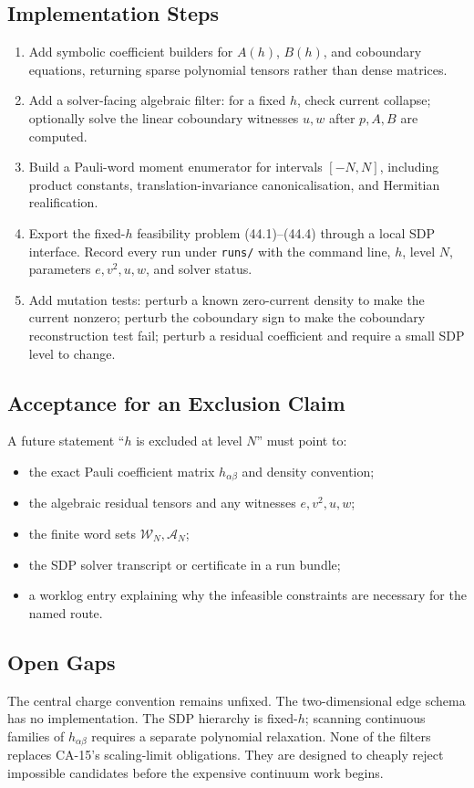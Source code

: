 \subsection{Implementation Steps}

\begin{enumerate}
\item Add symbolic coefficient builders for \(A(h)\), \(B(h)\), and
  coboundary equations, returning sparse polynomial tensors rather than dense
  matrices.
\item Add a solver-facing algebraic filter: for a fixed \(h\), check current
  collapse; optionally solve the linear coboundary witnesses \(u,w\) after
  \(p,A,B\) are computed.
\item Build a Pauli-word moment enumerator for intervals \([-N,N]\), including
  product constants, translation-invariance canonicalisation, and Hermitian
  realification.
\item Export the fixed-\(h\) feasibility problem (44.1)--(44.4) through a local
  SDP interface.  Record every run under \texttt{runs/} with the command line,
  \(h\), level \(N\), parameters \(e,v^2,u,w\), and solver status.
\item Add mutation tests: perturb a known zero-current density to make the
  current nonzero; perturb the coboundary sign to make the coboundary
  reconstruction test fail; perturb a residual coefficient and require a small
  SDP level to change.
\end{enumerate}

\subsection{Acceptance for an Exclusion Claim}

A future statement ``\(h\) is excluded at level \(N\)'' must point to:

\begin{itemize}
\item the exact Pauli coefficient matrix \(h_{\alpha\beta}\) and density
  convention;
\item the algebraic residual tensors and any witnesses \(e,v^2,u,w\);
\item the finite word sets \(\mathcal W_N,\mathcal A_N\);
\item the SDP solver transcript or certificate in a run bundle;
\item a worklog entry explaining why the infeasible constraints are necessary
  for the named route.
\end{itemize}

\subsection{Open Gaps}

The central charge convention remains unfixed.  The two-dimensional edge schema
has no implementation.  The SDP hierarchy is fixed-\(h\); scanning continuous
families of \(h_{\alpha\beta}\) requires a separate polynomial relaxation.
None of the filters replaces CA-15's scaling-limit obligations.  They are
designed to cheaply reject impossible candidates before the expensive continuum
work begins.

